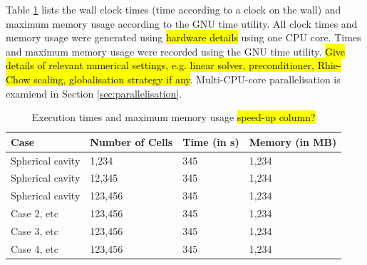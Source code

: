 \documentclass[sn-mathphys,Numbered]{sn-jnl}%
\begin{document}
Table \ref{tab:times_memory} lists the wall clock times (time according to a clock on the wall) and maximum memory usage according to the GNU time utility.
All clock times and memory usage were generated using \hl{hardware details} using one CPU core.
Times and maximum memory usage were recorded using the GNU time utility.
\hl{Give details of relevant numerical settings, e.g. linear solver, preconditioner, Rhie-Chow scaling, globalisation strategy if any}.
Multi-CPU-core parallelisation is examiend in Section \ref{sec:parallelisation}.
\begin{table}[htb]
	\centering
		\begin{tabular}{llll}
			\hline
			Case & Number of Cells & Time (in s) & Memory (in MB) \\
			\hline 
			Spherical cavity & 1,234 & 345 & 1,234  \\
			Spherical cavity & 12,345 & 345 & 1,234  \\
			Spherical cavity & 123,456 & 345 & 1,234  \\
			Case 2, etc & 123,456 & 345 & 1,234  \\
			Case 3, etc & 123,456 & 345 & 1,234  \\
			Case 4, etc & 123,456 & 345 & 1,234  \\
			\hline
		\end{tabular}
	\caption{Execution times and maximum memory usage \hl{speed-up column?}}
	\label{tab:times_memory}
\end{table}
\end{document}
